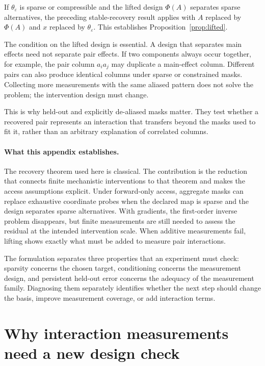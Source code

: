 \documentclass[sigconf,10pt,nonacm,balance=false]{acmart}
\newcommand{\eps}{\varepsilon}
\begin{document}
If $\theta_\eps$ is sparse or compressible and the lifted design $\Phi(A)$ separates sparse alternatives, the preceding stable-recovery result applies with $A$ replaced by $\Phi(A)$ and $x$ replaced by $\theta_\eps$. This establishes Proposition~\ref{prop:lifted}.

The condition on the lifted design is essential. A design that separates main effects need not separate pair effects. If two components always occur together, for example, the pair column $a_i a_j$ may duplicate a main-effect column. Different pairs can also produce identical columns under sparse or constrained masks. Collecting more measurements with the same aliased pattern does not solve the problem; the intervention design must change.

This is why held-out and explicitly de-aliased masks matter. They test whether a recovered pair represents an interaction that transfers beyond the masks used to fit it, rather than an arbitrary explanation of correlated columns.

\paragraph{What this appendix establishes.}
The recovery theorem used here is classical. The contribution is the reduction that connects finite mechanistic interventions to that theorem and makes the access assumptions explicit. Under forward-only access, aggregate masks can replace exhaustive coordinate probes when the declared map is sparse and the design separates sparse alternatives. With gradients, the first-order inverse problem disappears, but finite measurements are still needed to assess the residual at the intended intervention scale. When additive measurements fail, lifting shows exactly what must be added to measure pair interactions.

The formulation separates three properties that an experiment must check: sparsity concerns the chosen target, conditioning concerns the measurement design, and persistent held-out error concerns the adequacy of the measurement family. Diagnosing them separately identifies whether the next step should change the basis, improve measurement coverage, or add interaction terms.


\section{Why interaction measurements need a new design check}\label{app:lifted-conditioning}
\end{document}

